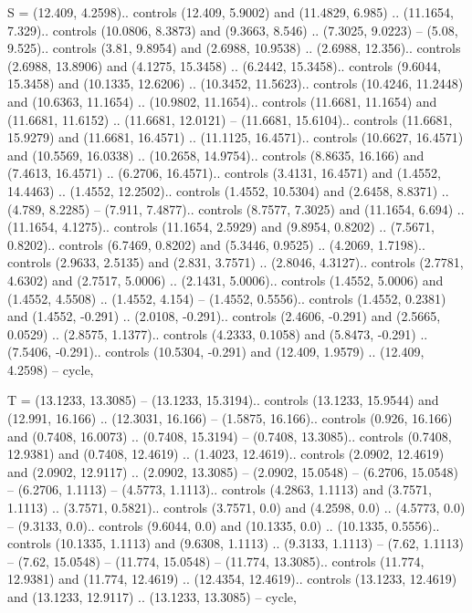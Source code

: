 S = {(12.409, 4.2598).. controls (12.409, 5.9002) and (11.4829, 6.985) .. (11.1654, 7.329).. controls (10.0806, 8.3873) and (9.3663, 8.546) .. (7.3025, 9.0223) -- (5.08, 9.525).. controls (3.81, 9.8954) and (2.6988, 10.9538) .. (2.6988, 12.356).. controls (2.6988, 13.8906) and (4.1275, 15.3458) .. (6.2442, 15.3458).. controls (9.6044, 15.3458) and (10.1335, 12.6206) .. (10.3452, 11.5623).. controls (10.4246, 11.2448) and (10.6363, 11.1654) .. (10.9802, 11.1654).. controls (11.6681, 11.1654) and (11.6681, 11.6152) .. (11.6681, 12.0121) -- (11.6681, 15.6104).. controls (11.6681, 15.9279) and (11.6681, 16.4571) .. (11.1125, 16.4571).. controls (10.6627, 16.4571) and (10.5569, 16.0338) .. (10.2658, 14.9754).. controls (8.8635, 16.166) and (7.4613, 16.4571) .. (6.2706, 16.4571).. controls (3.4131, 16.4571) and (1.4552, 14.4463) .. (1.4552, 12.2502).. controls (1.4552, 10.5304) and (2.6458, 8.8371) .. (4.789, 8.2285) -- (7.911, 7.4877).. controls (8.7577, 7.3025) and (11.1654, 6.694) .. (11.1654, 4.1275).. controls (11.1654, 2.5929) and (9.8954, 0.8202) .. (7.5671, 0.8202).. controls (6.7469, 0.8202) and (5.3446, 0.9525) .. (4.2069, 1.7198).. controls (2.9633, 2.5135) and (2.831, 3.7571) .. (2.8046, 4.3127).. controls (2.7781, 4.6302) and (2.7517, 5.0006) .. (2.1431, 5.0006).. controls (1.4552, 5.0006) and (1.4552, 4.5508) .. (1.4552, 4.154) -- (1.4552, 0.5556).. controls (1.4552, 0.2381) and (1.4552, -0.291) .. (2.0108, -0.291).. controls (2.4606, -0.291) and (2.5665, 0.0529) .. (2.8575, 1.1377).. controls (4.2333, 0.1058) and (5.8473, -0.291) .. (7.5406, -0.291).. controls (10.5304, -0.291) and (12.409, 1.9579) .. (12.409, 4.2598) -- cycle},

T = {(13.1233, 13.3085) -- (13.1233, 15.3194).. controls (13.1233, 15.9544) and (12.991, 16.166) .. (12.3031, 16.166) -- (1.5875, 16.166).. controls (0.926, 16.166) and (0.7408, 16.0073) .. (0.7408, 15.3194) -- (0.7408, 13.3085).. controls (0.7408, 12.9381) and (0.7408, 12.4619) .. (1.4023, 12.4619).. controls (2.0902, 12.4619) and (2.0902, 12.9117) .. (2.0902, 13.3085) -- (2.0902, 15.0548) -- (6.2706, 15.0548) -- (6.2706, 1.1113) -- (4.5773, 1.1113).. controls (4.2863, 1.1113) and (3.7571, 1.1113) .. (3.7571, 0.5821).. controls (3.7571, 0.0) and (4.2598, 0.0) .. (4.5773, 0.0) -- (9.3133, 0.0).. controls (9.6044, 0.0) and (10.1335, 0.0) .. (10.1335, 0.5556).. controls (10.1335, 1.1113) and (9.6308, 1.1113) .. (9.3133, 1.1113) -- (7.62, 1.1113) -- (7.62, 15.0548) -- (11.774, 15.0548) -- (11.774, 13.3085).. controls (11.774, 12.9381) and (11.774, 12.4619) .. (12.4354, 12.4619).. controls (13.1233, 12.4619) and (13.1233, 12.9117) .. (13.1233, 13.3085) -- cycle},

